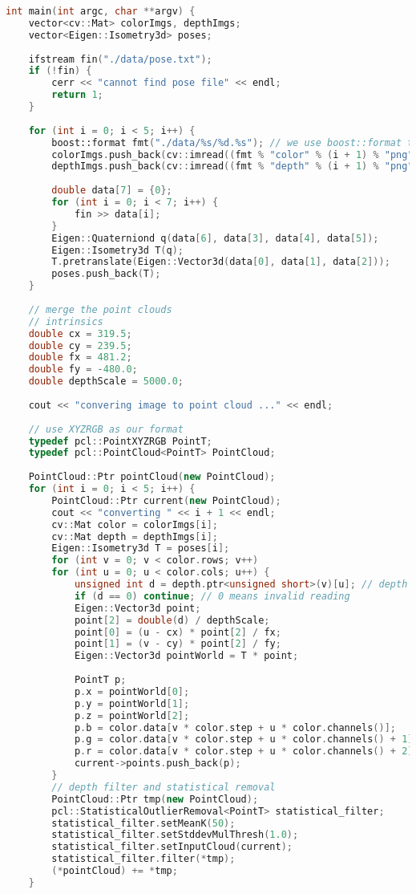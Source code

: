 \begin{lstlisting}[language=c++,caption=slambook/ch12/dense\_RGBD/pointcloud\_mapping.cpp (part)]
int main(int argc, char **argv) {
	vector<cv::Mat> colorImgs, depthImgs;   
	vector<Eigen::Isometry3d> poses;       
	
	ifstream fin("./data/pose.txt");
	if (!fin) {
		cerr << "cannot find pose file" << endl;
		return 1;
	}
	
	for (int i = 0; i < 5; i++) {
		boost::format fmt("./data/%s/%d.%s"); // we use boost::format to read image files
		colorImgs.push_back(cv::imread((fmt % "color" % (i + 1) % "png").str()));
		depthImgs.push_back(cv::imread((fmt % "depth" % (i + 1) % "png").str(), -1)); // use -1 to read the unchanged data
		
		double data[7] = {0};
		for (int i = 0; i < 7; i++) {
			fin >> data[i];
		}
		Eigen::Quaterniond q(data[6], data[3], data[4], data[5]);
		Eigen::Isometry3d T(q);
		T.pretranslate(Eigen::Vector3d(data[0], data[1], data[2]));
		poses.push_back(T);
	}
	
	// merge the point clouds
	// intrinsics
	double cx = 319.5;
	double cy = 239.5;
	double fx = 481.2;
	double fy = -480.0;
	double depthScale = 5000.0;
	
	cout << "convering image to point cloud ..." << endl;
	
	// use XYZRGB as our format
	typedef pcl::PointXYZRGB PointT;
	typedef pcl::PointCloud<PointT> PointCloud;
	
	PointCloud::Ptr pointCloud(new PointCloud);
	for (int i = 0; i < 5; i++) {
		PointCloud::Ptr current(new PointCloud);
		cout << "converting " << i + 1 << endl;
		cv::Mat color = colorImgs[i];
		cv::Mat depth = depthImgs[i];
		Eigen::Isometry3d T = poses[i];
		for (int v = 0; v < color.rows; v++)
		for (int u = 0; u < color.cols; u++) {
			unsigned int d = depth.ptr<unsigned short>(v)[u]; // depth data
			if (d == 0) continue; // 0 means invalid reading 
			Eigen::Vector3d point;
			point[2] = double(d) / depthScale;
			point[0] = (u - cx) * point[2] / fx;
			point[1] = (v - cy) * point[2] / fy;
			Eigen::Vector3d pointWorld = T * point;
			
			PointT p;
			p.x = pointWorld[0];
			p.y = pointWorld[1];
			p.z = pointWorld[2];
			p.b = color.data[v * color.step + u * color.channels()];
			p.g = color.data[v * color.step + u * color.channels() + 1];
			p.r = color.data[v * color.step + u * color.channels() + 2];
			current->points.push_back(p);
		}
		// depth filter and statistical removal 
		PointCloud::Ptr tmp(new PointCloud);
		pcl::StatisticalOutlierRemoval<PointT> statistical_filter;
		statistical_filter.setMeanK(50);
		statistical_filter.setStddevMulThresh(1.0);
		statistical_filter.setInputCloud(current);
		statistical_filter.filter(*tmp);
		(*pointCloud) += *tmp;
	}
	

\end{lstlisting}
